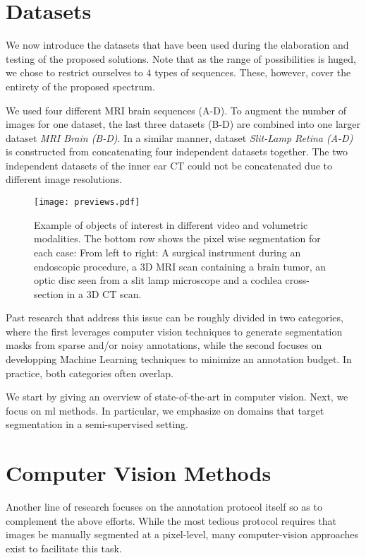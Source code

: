 \section{Datasets}

We now introduce the datasets that have been used during the elaboration and testing of the proposed solutions.
Note that as the range of possibilities is huged, we chose to restrict ourselves to $4$ types of sequences.
These, however, cover the entirety of the proposed spectrum.

We used four different MRI brain sequences (A-D).
To augment the number of images for one dataset, the last three datasets (B-D) are combined into one larger dataset \textit{MRI Brain (B-D)}.
In a similar manner, dataset \textit{Slit-Lamp Retina (A-D)} is constructed from concatenating four independent datasets together.
The two independent datasets of the inner ear CT could not be concatenated due to different image resolutions.



\begin{figure}
\centering
\texttt{[image: previews.pdf]}
\caption{Example of objects of interest in different video and volumetric modalities. The bottom row shows the pixel wise segmentation for each case: From left to right: A surgical instrument during an endoscopic procedure, a 3D MRI scan containing a brain tumor, an optic disc seen from a slit lamp microscope and a cochlea cross-section in a 3D CT scan.}
\label{fig:dset_previews}
\end{figure}


Past research that address this issue can be roughly divided in two categories,
where the first leverages computer vision techniques to generate segmentation masks from sparse and/or noisy annotations, while the second focuses on developping Machine Learning techniques to minimize an annotation budget.
In practice, both categories often overlap.

We start by giving an overview of state-of-the-art in computer vision.
Next, we focus on \gls{ml} methods.
In particular, we emphasize on domains that target segmentation in a semi-supervised setting.

\section{Computer Vision Methods}
Another line of research focuses on the annotation protocol itself so as to complement the above efforts.
While the most tedious protocol requires that images be manually segmented at a pixel-level, many computer-vision approaches exist to facilitate this task.

